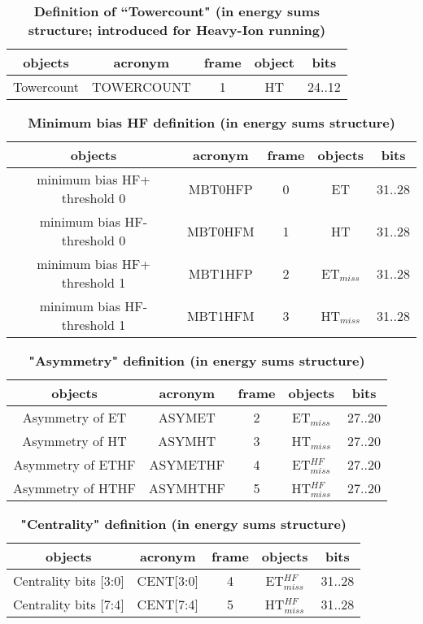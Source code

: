 \documentclass{cmspaper}
\begin{document}
\begin{table}[ht]
\caption{\bf Definition of ``Towercount"   \rm(in energy sums structure; introduced for Heavy-Ion running)}
\vspace{5mm}
\centering
\begin{tabular}{|c|c|c|c|c|}\hline
objects & acronym & frame & object & bits \\\hline\hline
Towercount & TOWERCOUNT & 1 & HT & 24..12 \\\hline
\end{tabular}
\label{table:tower_count_def}
\end{table}

\begin{table}[ht]
\caption{\bf Minimum bias HF definition \rm(in energy sums structure)}
\vspace{5mm}
\centering
\begin{tabular}{|c|c|c|c|c|}\hline
objects & acronym & frame & objects & bits \\\hline\hline
minimum bias HF+ threshold 0 & MBT0HFP & 0 & ET & 31..28 \\
minimum bias HF- threshold 0 & MBT0HFM & 1 & HT & 31..28 \\
minimum bias HF+ threshold 1 & MBT1HFP & 2 & ET$_{miss}$ & 31..28 \\
minimum bias HF- threshold 1 & MBT1HFM & 3 & HT$_{miss}$ & 31..28 \\\hline
\end{tabular}
\label{table:min_bias_def}
\end{table}

\begin{table}[ht]
\caption{\bf "Asymmetry" definition \rm(in energy sums structure)}
\vspace{5mm}
\centering
\begin{tabular}{|c|c|c|c|c|}\hline
objects & acronym & frame & objects & bits \\\hline\hline
Asymmetry of ET & ASYMET & 2 & ET$_{miss}$ & 27..20 \\
Asymmetry of HT & ASYMHT & 3 & HT$_{miss}$ & 27..20 \\
Asymmetry of ETHF & ASYMETHF & 4 & ET$_{miss}^{HF}$ & 27..20 \\
Asymmetry of HTHF & ASYMHTHF & 5 & HT$_{miss}^{HF}$ & 27..20 \\\hline
\end{tabular}
\label{table:asymmetry_def}
\end{table}

\begin{table}[ht]
\caption{\bf "Centrality" definition \rm(in energy sums structure)}
\vspace{5mm}
\centering
\begin{tabular}{|c|c|c|c|c|}\hline
objects & acronym & frame & objects & bits \\\hline\hline
Centrality bits [3:0] & CENT[3:0] & 4 & ET$_{miss}^{HF}$ & 31..28 \\
Centrality bits [7:4] & CENT[7:4] & 5 & HT$_{miss}^{HF}$ & 31..28 \\\hline
\end{tabular}
\label{table:centrality_def}
\end{table}
\end{document}
